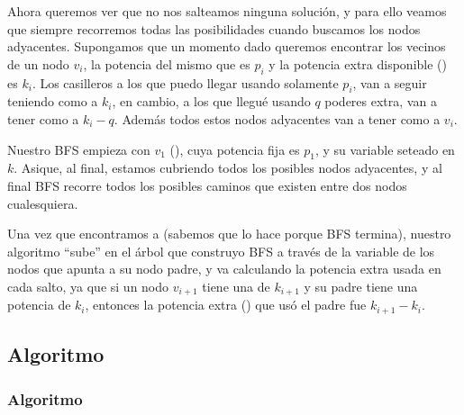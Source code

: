 Ahora queremos ver que no nos salteamos ninguna soluci\'on, y para ello veamos que siempre recorremos todas las posibilidades cuando buscamos los nodos adyacentes. Supongamos que un momento dado queremos encontrar los vecinos de un nodo $v_i$, la potencia del mismo que es $p_i$ y la potencia extra disponible () es $k_i$. Los casilleros a los que puedo llegar usando solamente $p_i$, van a seguir teniendo como  a $k_i$, en cambio, a los que llegu\'e usando $q$ poderes extra, van a tener como  a $k_i-q$. Adem\'as todos estos nodos adyacentes van a tener como  a $v_i$. 

Nuestro BFS empieza con $v_1$ (), cuya potencia fija es $p_1$, y su variable  seteado en $k$. Asique, al final, estamos cubriendo todos los posibles nodos adyacentes, y al final BFS recorre todos los posibles caminos que existen entre dos nodos cualesquiera. 

Una vez que encontramos a  (sabemos que lo hace porque BFS termina), nuestro algoritmo ``sube'' en el \'arbol que construyo BFS a trav\'es de la variable de los nodos  que apunta a su nodo padre, y va calculando la potencia extra usada en cada salto, ya que si un nodo $v_{i+1}$ tiene una  de $k_{i+1}$ y su padre tiene una potencia de $k_i$, entonces la potencia extra () que us\'o el padre fue $k_{i+1} - k_i$.

\subsection{Algoritmo}

\begin{algorithm}[H]
\caption{}\label{max_pb}
\begin{algorithmic}[1]
\STATE {}
      \STATE {}
      \RETURN {}
    \ELSE
      \STATE {}
      \STATE {}
    \ENDIF
  \ENDIF
\ENDFOR
\RETURN {}
\end{algorithmic}
\end{algorithm}

\subsubsection{Algoritmo}


